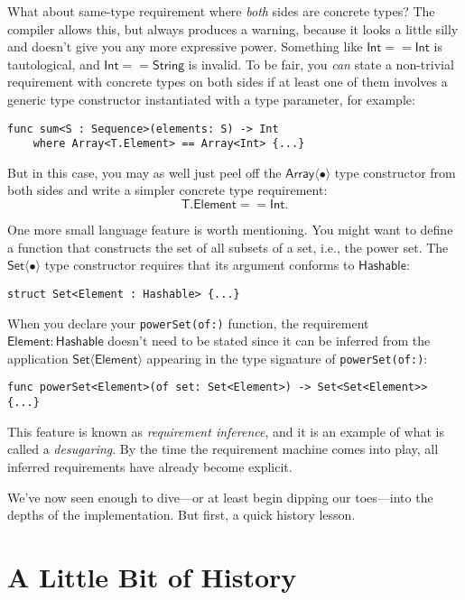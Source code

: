 \documentclass[headsepline,bibliography=totoc]{scrreport}
\newcommand{\namesym}[1]{\mathsf{#1}}
\newcommand{\genericparam}[1]{\bm{\mathsf{#1}}}
\newcommand{\proto}[1]{\bm{\mathsf{#1}}}
\theoremstyle{definition}
\theoremstyle{definition}
\theoremstyle{definition}
\begin{document}
What about same-type requirement where \emph{both} sides are concrete types? The compiler allows this, but always produces a warning, because it looks a little silly and doesn't give you any more expressive power. Something like $\namesym{Int} == \namesym{Int}$ is tautological, and $\namesym{Int} == \namesym{String}$ is invalid. To be fair, you \emph{can} state a non-trivial requirement with concrete types on both sides if at least one of them involves a generic type constructor instantiated with a type parameter, for example:
\begin{Verbatim}
func sum<S : Sequence>(elements: S) -> Int
    where Array<T.Element> == Array<Int> {...}
\end{Verbatim}
But in this case, you may as well just peel off the $\namesym{Array}\langle\bullet\rangle$ type constructor from both sides and write a simpler concrete type requirement:
\[\genericparam{T}.\namesym{Element} == \namesym{Int}.\]

One more small language feature is worth mentioning. You might want to define a function that constructs the set of all subsets of a set, i.e., the power set. The $\namesym{Set}\langle\bullet\rangle$ type constructor requires that its argument conforms to $\proto{Hashable}$:
\begin{Verbatim}
struct Set<Element : Hashable> {...}
\end{Verbatim}
When you declare your \texttt{powerSet(of:)} function, the requirement $\genericparam{Element}\colon\proto{Hashable}$ doesn't need to be stated since it can be inferred from the application $\namesym{Set}\langle\genericparam{Element}\rangle$ appearing in the type signature of \texttt{powerSet(of:)}:
\begin{Verbatim}
func powerSet<Element>(of set: Set<Element>) -> Set<Set<Element>> {...}
\end{Verbatim}
This feature is known as \emph{requirement inference}, and it is an example of what is called a \emph{desugaring}. By the time the requirement machine comes into play, all inferred requirements have already become explicit.


We've now seen enough to dive---or at least begin dipping our toes---into the depths of the implementation. But first, a quick history lesson.

\chapter{A Little Bit of History}\label{history}
\end{document}
